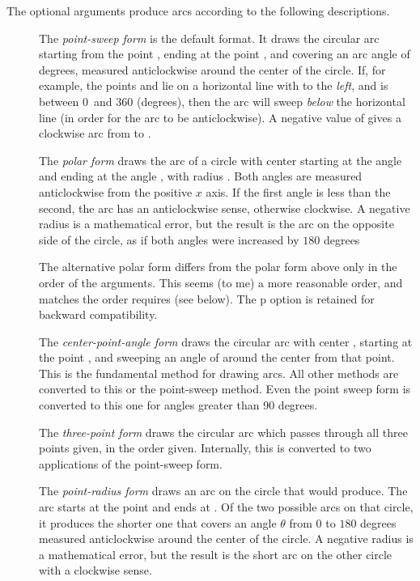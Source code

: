 \documentclass[letterpaper]{article}
\begin{document}
The optional arguments produce arcs according to the following
descriptions.
\begin{description}
\item[] The \textit{point-sweep form} is the default format. It
draws the circular arc starting from the point , ending at
the point , and covering an arc angle of \meta{$\theta$}
degrees, measured anticlockwise around the center of the circle. If,
for example, the points  and  lie on a
horizontal line with  to the \emph{left}, and \meta{$\theta$}
is between $0$~and $360$ (degrees), then the arc will sweep \emph{below} the
horizontal line (in order for the arc to be anticlockwise). A
negative value of \meta{$\theta$} gives a clockwise arc from 
to .

\item[] The \textit{polar form} draws the arc of a circle with
center  starting at the angle  and ending at
the angle , with radius . Both angles are
measured anticlockwise from the positive $x$ axis. If the first angle is
less than the second, the arc has an anticlockwise sense, otherwise
clockwise. A negative radius is a mathematical error, but the result is
the arc on the opposite side of the circle, as if both angles were
increased by $180$ degrees

\item[] The alternative polar form differs from the polar form
above only in the order of the arguments. This seems (to me) a more
reasonable order, and matches the order  requires (see below).
The p option is retained for backward compatibility.

\item[] The \textit{center-point-angle form} draws the circular
arc with center , starting at the point , and
sweeping an angle of \meta{$\theta$} around the center from that point.
This is the fundamental method for drawing arcs. All other methods are
converted to this or the point-sweep method. Even the point sweep form
is converted to this one for angles greater than 90 degrees.

\item[] The \textit{three-point form} draws the circular arc
which passes through all three points given, in the order given.
Internally, this is converted to two applications of the point-sweep
form.

\item[] The \textit{point-radius form} draws an arc on the
circle that  would produce. The arc starts at the
point  and ends at . Of the two possible arcs on
that circle, it produces the shorter one that covers an angle $\theta$
from $0$ to $180$ degrees measured anticlockwise around the center
of the circle. A negative radius is a mathematical error, but the result
is the short arc on the other circle with a clockwise sense.


\end{description}
\end{document}
